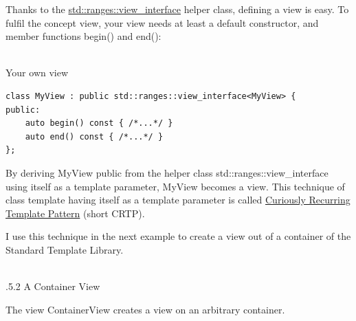 Thanks to the \href{https://en.cppreference.com/w/cpp/ranges/view_interface}{std::ranges::view\_interface} helper class, defining a view is easy. To fulfil the concept view, your view needs at least a default constructor, and member functions begin() and end():

\hspace*{\fill} \\ %
\noindent
Your own view
\begin{lstlisting}[style=styleCXX]
class MyView : public std::ranges::view_interface<MyView> {
public:
	auto begin() const { /*...*/ }
	auto end() const { /*...*/ }
};
\end{lstlisting}

By deriving MyView public from the helper class std::ranges::view\_interface using itself as a template parameter, MyView becomes a view. This technique of class template having itself as a template parameter is called \href{https://www.modernescpp.com/index.php/c-is-still-lazy}{Curiously Recurring Template Pattern} (short CRTP).

I use this technique in the next example to create a view out of a container of the Standard Template Library.

\hspace*{\fill} \\ %
.5.2\hspace{0.2cm} A Container View

The view ContainerView creates a view on an arbitrary container.


